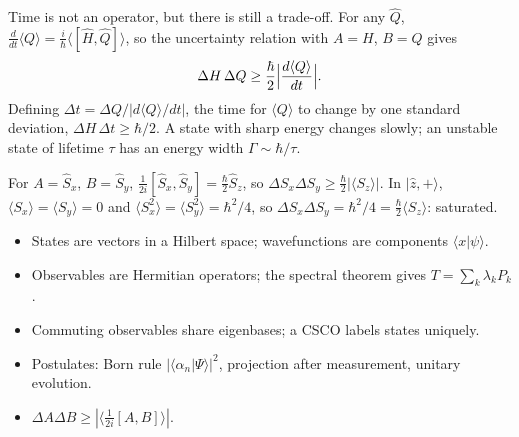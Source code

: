 \begin{example}
Time is not an operator, but there is still a trade-off. For any $\hat{Q}$, $\frac{d}{dt}\langle Q\rangle = \frac{i}{\hbar}\langle[\hat{H},\hat{Q}]\rangle$, so the uncertainty relation with $A = H$, $B = Q$ gives
\[
    \Delta H\,\Delta Q\ge\frac\hbar2\Bigl|\frac{d\langle Q\rangle}{dt}\Bigr| .
\]
Defining $\Delta t = \Delta Q/|d\langle Q\rangle/dt|$, the time for $\langle Q\rangle$ to change by one standard deviation, $\Delta H\,\Delta t\ge\hbar/2$. A state with sharp energy changes slowly; an unstable state of lifetime $\tau$ has an energy width $\Gamma\sim\hbar/\tau$.
\end{example}

\begin{example}
For $A = \hat{S}_x$, $B = \hat{S}_y$, $\frac{1}{2i}[\hat{S}_x,\hat{S}_y] = \frac\hbar2\hat{S}_z$, so $\Delta S_x\Delta S_y\ge\frac\hbar2|\langle S_z\rangle|$. In $|\hat{z},+\rangle$, $\langle S_x\rangle = \langle S_y\rangle = 0$ and $\langle S_x^2\rangle = \langle S_y^2\rangle = \hbar^2/4$, so $\Delta S_x\Delta S_y = \hbar^2/4 = \frac\hbar2\langle S_z\rangle$: saturated.
\end{example}

\begin{fact}
\leavevmode
\begin{itemize}
\item States are vectors in a Hilbert space; wavefunctions are components $\langle x|\psi\rangle$.
\item Observables are Hermitian operators; the spectral theorem gives $T = \sum_k\lambda_kP_k$.
\item Commuting observables share eigenbases; a CSCO labels states uniquely.
\item Postulates: Born rule $|\langle\alpha_n|\Psi\rangle|^2$, projection after measurement, unitary evolution.
\item $\Delta A\Delta B\ge|\langle\frac{1}{2i}[A,B]\rangle|$.
\end{itemize}
\end{fact}
